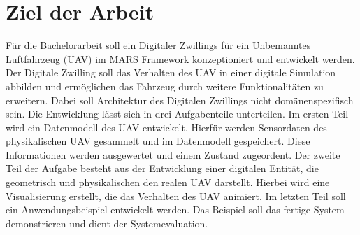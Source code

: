 \section{Ziel der Arbeit}

Für die Bachelorarbeit soll ein Digitaler Zwillings für ein Unbemanntes Luftfahrzeug (UAV) im MARS Framework konzeptioniert und entwickelt werden. Der Digitale Zwilling soll das Verhalten des UAV in einer digitale Simulation abbilden und ermöglichen das Fahrzeug durch weitere Funktionalitäten zu erweitern. Dabei soll Architektur des Digitalen Zwillings nicht domänenspezifisch sein. \newline
Die Entwicklung lässt sich in drei Aufgabenteile unterteilen.
Im ersten Teil wird ein Datenmodell des UAV entwickelt. Hierfür werden Sensordaten des physikalischen UAV gesammelt und im Datenmodell gespeichert. Diese Informationen werden ausgewertet und einem Zustand zugeordent. \newline
Der zweite Teil der Aufgabe besteht aus der Entwicklung einer digitalen Entität, die geometrisch und physikalischen den realen UAV darstellt. Hierbei wird eine Visualisierung erstellt, die das Verhalten des UAV animiert. \newline
Im letzten Teil soll ein Anwendungsbeispiel entwickelt werden. Das Beispiel soll das fertige System demonstrieren und dient der Systemevaluation.




